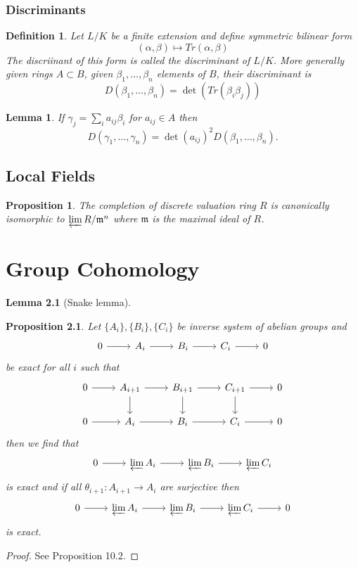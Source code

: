 \documentclass[twoside, 12pt]{iiser-thesis}
\newtheorem{prop}[thm]{ Proposition}
\newtheorem{lem}[thm]{ Lemma}
\newtheorem{defi}{ Definition}[section]
\begin{document}
\subsection{Discriminants}
\begin{defi}
Let $L/K$ be a finite extension and define symmetric bilinear form $$(\alpha, \beta ) \mapsto Tr(\alpha, \beta)$$The discriinant of this form is called the discriminant of $L/K$. 
 \newline More generally given rings $A \subset B$, given $\beta _1, \dots , \beta _n$ elements of $B$, their discriminant is $$D(\beta _1, \dots , \beta _n) = \det (Tr(\beta _i \beta _j))$$ 
\end{defi}
\begin{lem}
If $\gamma _j = \sum _i a_{ij}\beta _i$ for $a_{ij}\in A$ then $$D(\gamma _1, \dots , \gamma _n) = \det (a_{ij})^2 D(\beta _1, \dots , \beta _n).$$
\end{lem}
\section{Local Fields}
\begin{prop}
The completion of discrete valuation ring $R$ is canonically isomorphic to $\varprojlim R/ \mathfrak m ^n$ where $\mathfrak m$ is the maximal ideal of $R$.
\end{prop}
\chapter{Group Cohomology}
\begin{lem}[Snake lemma]
\end{lem}
\begin{prop}\label{inverselimitexact}
Let $\{A_i\},\{B_i\}, \{C_i\}$ be inverse system of abelian groups and \[ \begin{tikzcd}
0 \arrow[r] & A_i \arrow[r] & B_i \arrow[r] & C_i \arrow[r] & 0 
\end{tikzcd}\] be exact for all $i$ such that 
\[ \begin{tikzcd}
 0 \arrow [r] & A_{i+1} \arrow[r] \arrow[d] & B_{i+1} \arrow[d] \arrow[r] & C_{i+1} \arrow[r] \arrow[d] & 0 \\
0 \arrow[r] & A_i \arrow[r] & B_i \arrow[r] & C_i \arrow[r] & 0
\end{tikzcd} \] then we find that 
\[ \begin{tikzcd}
0 \arrow[r] & \varprojlim A_i \arrow[r] & \varprojlim B_i \arrow[r] & \varprojlim C_i 
\end{tikzcd}\]
is exact and if all $\theta_{i+1}:A_{i+1}\rightarrow A_i$ are surjective then \[ \begin{tikzcd}
0 \arrow[r] & \varprojlim A_i \arrow[r] & \varprojlim B_i \arrow[r] & \varprojlim C_i \arrow[r] & 0
\end{tikzcd}\] is exact.
\end{prop}
\begin{proof}
See \cite{atiyah} Proposition 10.2.
\end{proof}
\end{document}
